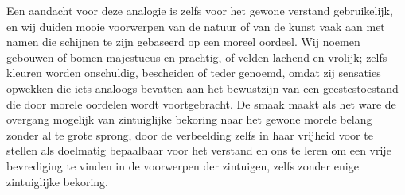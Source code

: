 Een aandacht voor deze analogie is zelfs voor het gewone verstand gebruikelijk, en wij duiden mooie voorwerpen van de natuur of van de kunst vaak aan met namen die schijnen te zijn gebaseerd op een moreel oordeel. Wij noemen gebouwen of bomen majestueus en prachtig, of velden lachend en vrolijk; zelfs kleuren worden onschuldig, bescheiden of teder genoemd, omdat zij sensaties opwekken die iets analoogs bevatten aan het bewustzijn van een geestestoestand die door morele oordelen wordt voortgebracht. De smaak maakt als het ware de overgang mogelijk van zintuiglijke bekoring naar het gewone morele belang zonder al te grote sprong, door de verbeelding zelfs in haar vrijheid voor te stellen als doelmatig bepaalbaar voor het verstand en ons te leren om een vrije bevrediging te vinden in de voorwerpen der zintuigen, zelfs zonder enige zintuiglijke bekoring.

